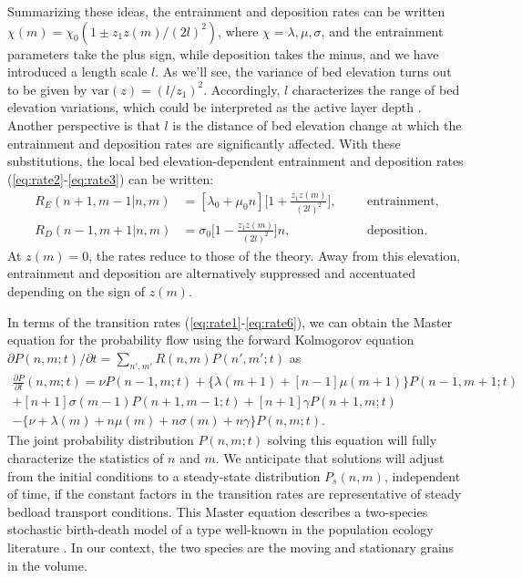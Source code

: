 \documentclass[draft]{agujournal2018}
\begin{document}
Summarizing these ideas, the entrainment and deposition rates can be written $\chi(m) = \chi_0(1\pm z_1 z(m)/(2l)^2)$, where $\chi = \lambda, \mu, \sigma$, and the entrainment parameters take the plus sign, while deposition takes the minus, and we have introduced a length scale $l$.
As we'll see, the variance of bed elevation turns out to be given by $\text{var}(z) = (l / z_1)^2$. Accordingly, $l$ characterizes the range of bed elevation variations, which could be interpreted as the active layer depth \citep[e.g.][]{Church2017}.
Another perspective is that $l$ is the distance of bed elevation change at which the entrainment and deposition rates are significantly affected.
With these substitutions, the local bed elevation-dependent entrainment and deposition rates (\ref{eq:rate2}-\ref{eq:rate3}) can be written:
\begin{align}
R_E(n+1,m-1|n,m)&=[\lambda_0 + \mu_0 n]\Big[1 + \frac{z_1z(m)}{(2l)^2}\Big], && &\text{entrainment}, \label{eq:rate5}\\
R_D(n-1,m+1|n,m)&=\sigma_0 \Big[1-\frac{z_1z(m)}{(2l)^2}\Big]n, && &\text{deposition}. \label{eq:rate6}
\end{align}
At $z(m)=0$, the rates reduce to those of the \citet{Ancey2008} theory.
Away from this elevation, entrainment and deposition are alternatively suppressed and accentuated depending on the sign of $z(m)$.


In terms of the transition rates (\ref{eq:rate1}-\ref{eq:rate6}), we can obtain the Master equation for the probability flow using the forward Kolmogorov equation $\partial P(n,m;t)/\partial t = 
\sum_{n',m'} R(n,m)P(n',m';t)$ \citep[e.g.][]{Cox1965, Gillespie1992, Ancey2008} as 
\begin{multline}
 \frac{\partial P}{\partial t}(n,m;t) =  
\nu P(n-1,m;t) + 
\{\lambda(m+1) + [n-1]\mu(m+1)\}P(n-1,m+1;t)\\ + 
[n+1]\sigma(m-1)P(n+1,m-1;t) + 
[n+1]\gamma P(n+1,m;t) \\- 
\{ \nu + \lambda(m) + n\mu(m) + n\sigma(m) + n \gamma \}P(n,m;t).
 \label{eq:master}
\end{multline}
The joint probability distribution $P(n,m;t)$ solving this equation will fully characterize the statistics of $n$ and $m$.
We anticipate that solutions will adjust from the initial conditions to a steady-state distribution $P_s(n,m)$, independent of time, if the constant factors in the transition rates are representative of steady bedload transport conditions.
This Master equation describes a two-species stochastic birth-death model \citep[e.g.][]{Cox1965} of a type well-known in the population ecology literature \citep[e.g.][]{Pielou1977, Swift2002}.
In our context, the two species are the moving and stationary grains in the volume.
\end{document}
